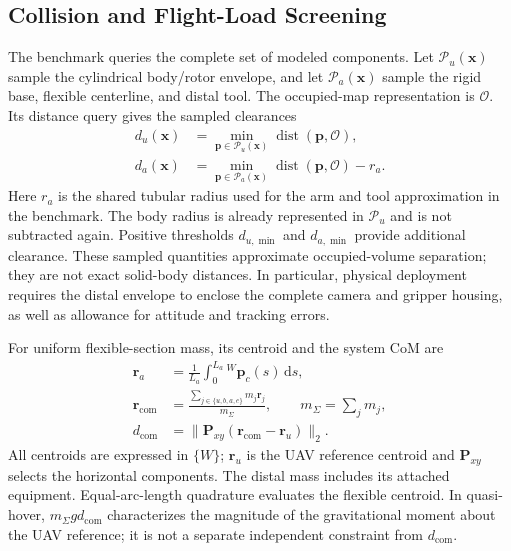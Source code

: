 \documentclass[journal,twoside]{IEEEtran}
\newcommand{\dist}{\operatorname{dist}}
\begin{document}
\subsection{Collision and Flight-Load Screening}
The benchmark queries the complete set of modeled components. Let $\mathcal P_u(\mathbf x)$ sample the cylindrical body/rotor envelope, and let $\mathcal P_a(\mathbf x)$ sample the rigid base, flexible centerline, and distal tool. The occupied-map representation is $\mathcal O$. Its distance query gives the sampled clearances
\begin{equation}
\begin{aligned}
d_u(\mathbf x)&=\min_{\mathbf p\in\mathcal P_u(\mathbf x)}\dist(\mathbf p,\mathcal O),\\
d_a(\mathbf x)&=\min_{\mathbf p\in\mathcal P_a(\mathbf x)}\dist(\mathbf p,\mathcal O)-r_a.
\end{aligned}
\label{eq:clearance}
\end{equation}
Here $r_a$ is the shared tubular radius used for the arm and tool approximation in the benchmark. The body radius is already represented in $\mathcal P_u$ and is not subtracted again. Positive thresholds $d_{u,\min}$ and $d_{a,\min}$ provide additional clearance. These sampled quantities approximate occupied-volume separation; they are not exact solid-body distances. In particular, physical deployment requires the distal envelope to enclose the complete camera and gripper housing, as well as allowance for attitude and tracking errors.

For uniform flexible-section mass, its centroid and the system CoM are
\begin{equation}
\begin{aligned}
\mathbf r_a&=\frac{1}{L_a}\int_0^{L_a}{}^W\mathbf p_c(s)\,\mathrm ds,\\
\mathbf r_{\mathrm{com}}&=\frac{\sum_{j\in\{u,b,a,e\}}m_j\mathbf r_j}{m_\Sigma},
\qquad m_\Sigma=\sum_jm_j,\\
d_{\mathrm{com}}&=\|\mathbf P_{xy}(\mathbf r_{\mathrm{com}}-\mathbf r_u)\|_2.
\end{aligned}
\label{eq:com}
\end{equation}
All centroids are expressed in $\{W\}$; $\mathbf r_u$ is the UAV reference centroid and $\mathbf P_{xy}$ selects the horizontal components. The distal mass includes its attached equipment. Equal-arc-length quadrature evaluates the flexible centroid. In quasi-hover, $m_\Sigma g d_{\mathrm{com}}$ characterizes the magnitude of the gravitational moment about the UAV reference; it is not a separate independent constraint from $d_{\mathrm{com}}$.
\end{document}

